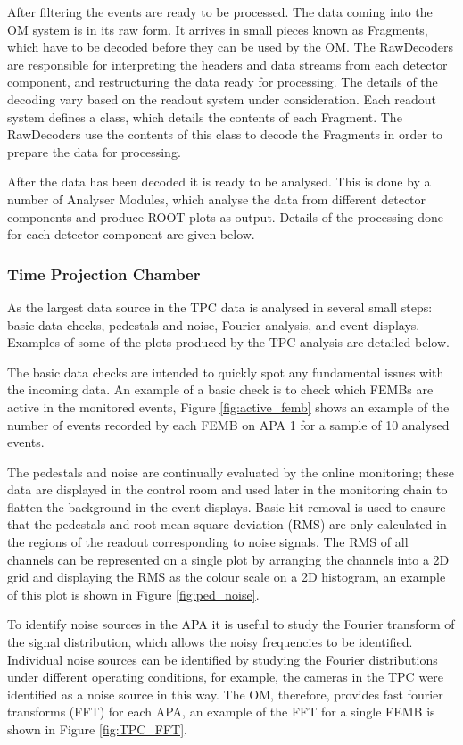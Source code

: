 After filtering the events are ready to be processed. The data coming into the
OM system is in its raw form. It arrives in small pieces known as
Fragments, which have to be decoded before they can be used by the OM. 
The RawDecoders are responsible for interpreting the headers and data streams 
from each detector component, and restructuring the data ready for processing. 
The details of the decoding vary based on the readout system under 
consideration. Each readout system defines a class, which details the 
contents of each Fragment. The RawDecoders use the contents of this class to 
decode the Fragments in order to prepare the data for 
processing.

After the data has been decoded it is ready to be analysed. This is done by a
number of Analyser Modules, which analyse the data from different detector
components and produce ROOT\cite{ANTCHEVA20092499} plots as output. Details 
of the processing done for each detector component are given below.

\subsubsection*{Time Projection Chamber}
As the largest data source in \protodune{} the TPC data is analysed in several
small steps: basic data checks, pedestals and noise, Fourier analysis, and event
displays. Examples of some of the plots produced by the TPC analysis are
detailed below.

The basic data checks are intended to quickly spot any fundamental issues with
the incoming data. An example of a basic check is to check which FEMBs are
active in the monitored events, Figure \ref{fig:active_femb} shows an example of
the number of events recorded by each FEMB on APA 1 for a sample of 10 analysed
events.

The pedestals and noise are continually evaluated by the online monitoring;
these data are displayed in the control room and used later in the monitoring 
chain to flatten the background in the event displays. Basic hit removal is 
used to ensure that the pedestals and root mean square deviation (RMS) are 
only calculated in the regions of the readout corresponding to noise signals. 
The RMS of all channels can be represented on a single plot by arranging the 
channels into a 2D grid and displaying the RMS as the colour scale on a 2D 
histogram, an example of this plot is shown in Figure \ref{fig:ped_noise}.

To identify noise sources in the APA it is useful to study the Fourier transform
of the signal distribution, which allows the noisy frequencies to be identified.
Individual noise sources can be identified by studying the Fourier 
distributions under different operating conditions, for example, the cameras 
in the TPC were identified as a noise source in this way. The OM, therefore, 
provides fast fourier transforms (FFT) for each APA, an example of the FFT for 
a single FEMB is shown in Figure \ref{fig:TPC_FFT}.

